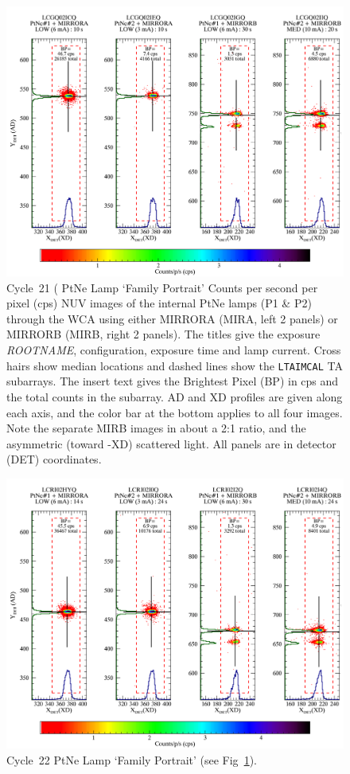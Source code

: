 \begin{figure}[htb]
\noindent\includegraphics[width=0.9\linewidth]{png/C21_13526_FP.png}
\caption[C21 WCA Lamp `Family Portrait']{Cycle~21 ( PtNe Lamp `Family Portrait'
Counts per second per pixel (cps) NUV images of the internal PtNe lamps (P1 \& P2) through the
WCA using either MIRRORA (MIRA, left 2 panels) or MIRRORB (MIRB, right 2 panels). The titles
give the exposure \textit{ROOTNAME}, configuration, exposure time and lamp current. Cross hairs show median locations and dashed
lines show the \texttt{LTAIMCAL} TA subarrays.
The insert text gives the Brightest Pixel (BP) in cps and the total counts in the subarray.
AD and XD profiles are given along each axis, and the color bar at the
bottom applies to all four images. Note the separate MIRB images in about a 2:1 ratio, and the asymmetric
(toward -XD) scattered light. All panels are in detector (DET) coordinates.\label{fig:FG21}}
\end{figure}

\begin{figure}[htb]
\noindent\includegraphics*[width=0.9\linewidth]{png/C22_13972_FP.png}
\caption[C22 WCA Lamp `Family Portrait']{Cycle~22 PtNe Lamp `Family Portrait' (see Fig~\ref{fig:FG21}). \label{fig:FG22}}
\end{figure}

